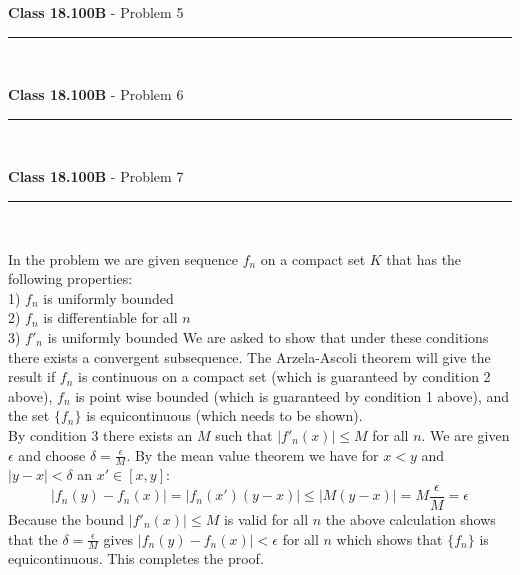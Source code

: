 \documentclass[11pt,reqno]{article}
\begin{document}
\vspace{15pt}
\begin{flushleft} 
\textbf{Class 18.100B} - Problem 5\\
\rule{500pt}{1pt}\\
\end{flushleft} 


\vspace{15pt}
\begin{flushleft} 
\textbf{Class 18.100B} - Problem 6\\
\rule{500pt}{1pt}\\
\end{flushleft} 


\vspace{15pt}
\begin{flushleft} 
\textbf{Class 18.100B} - Problem 7\\
\rule{500pt}{1pt}\\
\end{flushleft} 

In the problem we are given sequence $f_n$ on a compact set $K$ that has the following properties:\\
1) $f_n$ is uniformly bounded\\
2) $f_n$ is differentiable for all $n$\\
3) $f'_n$ is uniformly bounded
We are asked to show that under these conditions there exists a convergent subsequence.
The Arzela-Ascoli theorem will give the result if $f_n$ is continuous on a compact set (which is guaranteed by condition 2 above), $f_n$ is point wise bounded (which is guaranteed by condition 1 above), and the set $\{f_n\}$ is equicontinuous (which needs to be shown).\\
By condition 3 there exists an $M$ such that $|f'_n(x)| \le M$ for all $n$. We are given $\epsilon$ and choose $\delta = \frac{\epsilon}{M}$. By the mean value theorem we have for $x < y$ and $|y-x| < \delta$ an $x' \in [x,y]$:
\[ |f_n(y) - f_n(x)| = |f_n(x')(y - x)| \le |M(y-x)| = M \frac{\epsilon}{M} = \epsilon\]
Because the bound $|f'_n(x)| \le M$ is valid for all $n$ the above calculation shows that the $\delta = \frac{\epsilon}{M}$ gives $|f_n(y)- f_n(x)| < \epsilon$ for all $n$ which shows that $\{ f_n \}$ is equicontinuous. This completes the proof.
\end{document}
